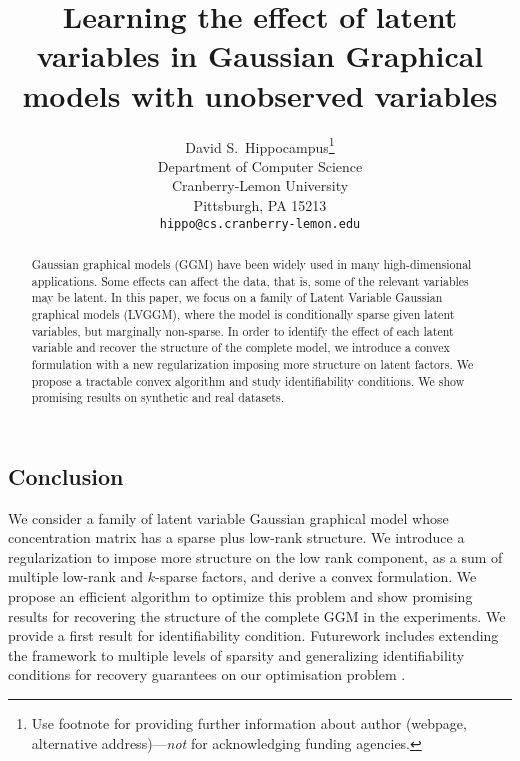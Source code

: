 \documentclass{article}
\title{Learning the effect of latent variables in Gaussian Graphical models with unobserved variables}
\author{
  David S.~Hippocampus\thanks{Use footnote for providing further
    information about author (webpage, alternative
    address)---\emph{not} for acknowledging funding agencies.} \\
  Department of Computer Science\\
  Cranberry-Lemon University\\
  Pittsburgh, PA 15213 \\
  \texttt{hippo@cs.cranberry-lemon.edu} \\
}
\begin{document}

\maketitle

\begin{abstract}
Gaussian graphical models (GGM) have been widely used in many high-dimensional applications. Some effects can affect the data, that is, some of the relevant variables may be latent. In this paper, we focus on a family of Latent Variable Gaussian graphical models (LVGGM), where the model is conditionally sparse given latent variables, but marginally non-sparse. In order to identify the effect of each latent variable and recover the structure of the complete model, we introduce a convex formulation with a new regularization imposing more structure on latent factors.  We propose a tractable convex algorithm and study identifiability conditions. We show promising results on synthetic and real datasets.\\
\end{abstract}




 








\subsection*{Conclusion}
We consider a family of latent variable Gaussian graphical model whose concentration matrix has a sparse plus low-rank structure. We introduce a regularization to impose more structure on the low rank component, as a sum of multiple low-rank and $k$-sparse factors, and derive a convex formulation. We propose an efficient algorithm to optimize this problem and show promising results for recovering the structure of the complete GGM in the experiments. We provide a first result for identifiability condition. Futurework includes extending the framework to multiple levels of sparsity and generalizing identifiability conditions for recovery guarantees on our optimisation problem .




\end{document}
